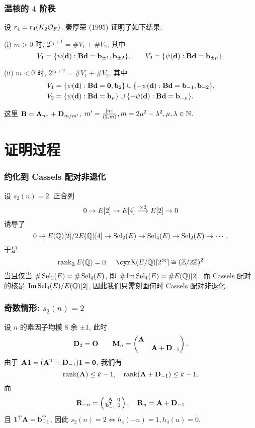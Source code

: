 \documentclass{beamer}
\begin{document}
\begin{frame}
\frametitle{温核的 $4$ 阶秩}
设 $r_4=r_4(K_2\CO_F)$. 秦厚荣 (1995) 证明了如下结果:

(i) $m>0$ 时, $2^{r_4+1}=\#V_1+\#V_2$, 其中 
\[V_1=\set{\psi(\bfd): \bfB\bfd=\bfb_{\pm1},\bfb_{\pm2}},\qquad
V_2=\set{\psi(\bfd): \bfB\bfd=\bfb_{\pm\mu}}.\]

(ii) $m<0$ 时, $2^{r_4+2}=\#V_1+\#V_2$, 其中 
\[\begin{split}
V_1&=\set{\psi(\bfd): \bfB\bfd={\bf0},\bfb_2}\cup\set{-\psi(\bfd): \bfB\bfd=\bfb_{-1},\bfb_{-2}},\\
V_2&=\set{\psi(\bfd): \bfB\bfd=\bfb_{\mu}}\cup\set{-\psi(\bfd): \bfB\bfd=\bfb_{-\mu}}.
\end{split}\]

这里 $\bfB=\bfA_{m'}+\bfD_{m/m'}$, $m'=\frac{|m|}{(2,m)}, m=2\mu^2-\lambda^2,\mu,\lambda\in\BN$.
\end{frame}

\section{证明过程}
\begin{frame}
\frametitle{约化到 Cassels 配对非退化}
设 $s_2(n)=2$.
正合列
\[0\ra E[2]\ra E[4]\sto{\times 2}E[2]\ra 0\]
诱导了
\[0\ra E(\BQ)[2]/2E(\BQ)[4]\ra \Sel_2(E)\ra \Sel_4(E)\ra \Sel_2(E)\ra\cdots.\] 
于是
\[\rank_\BZ E(\BQ)=0,\quad\Sha(E/\BQ)[2^\infty]\cong(\BZ/2\BZ)^2\]
当且仅当 $\#\Sel_2(E)=\#\Sel_4(E)$, 即 $\#\Im\Sel_4(E)=\#E(\BQ)[2]$. 而 Cassels 配对的核是 $\Im\Sel_4(E)/E(\BQ)[2]$, 因此我们只需刻画何时 Cassels 配对非退化.
\end{frame}

\begin{frame}
\frametitle{奇数情形: $s_2(n)=2$}
设 $n$ 的素因子均模 $8$ 余 $\pm1$, 此时
\[\bfD_2=\bfO\qquad 
\bfM_n=\begin{pmatrix}
\bfA&\\&\bfA+\bfD_{-1}
\end{pmatrix}.\]
由于 $\bfA{\bf1}=(\bfA^\rmT+\bfD_{-1}){\bf1}={\bf0}$, 我们有
\[\rank(\bfA)\le k-1,\quad \rank(\bfA+\bfD_{-1})\le k-1.\]
而
\[\bfR_{-n}=\left(\begin{smallmatrix}
\bfA&{\bf0}\\\bfb_{-1}^\rmT&0
\end{smallmatrix}\right),\quad
\bfR_n=\bfA+\bfD_{-1}\]
且 ${\bf1}^\rmT\bfA=\bfb_{-1}^\rmT$, 因此 $s_2(n)=2\iff h_4(-n)=1, h_4(n)=0$.
\end{frame}
\end{document}
